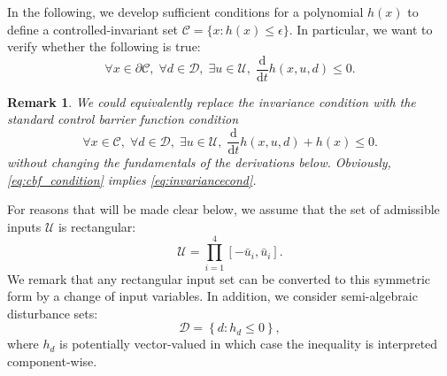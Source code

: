 \documentclass[conference]{IEEEtran}
\newtheorem{remark}{Remark}
\begin{document}
In the following, we develop sufficient conditions for a polynomial $h(x)$ to define a controlled-invariant set $\mathcal C = \{ x : h(x) \leq \epsilon \}$. In particular, we want to verify whether the following is true:
\begin{equation}
\label{eq:invariancecond}
   \forall x \in \partial \mathcal C, \;  \forall d \in \mathcal D, \; \exists u \in \mathcal U, \; \frac{\mathrm{d}}{\mathrm{d}t} h(x,u,d) \leq 0.
 \end{equation} 
\begin{remark}
  We could equivalently replace the invariance condition with the standard control barrier function condition
  \begin{equation}
  \label{eq:cbf_condition}
    \forall x \in \mathcal C, \;  \forall d \in \mathcal D, \; \exists u \in \mathcal U, \; \frac{\mathrm{d}}{\mathrm{d}t} h(x,u,d) + h(x) \leq 0.
  \end{equation}
  without changing the fundamentals of the derivations below. Obviously, \eqref{eq:cbf_condition} implies \eqref{eq:invariancecond}.
\end{remark}
 For reasons that will be made clear below, we assume that the set of admissible inputs $\mathcal U$ is rectangular:
 \begin{equation}
   \mathcal U = \prod_{i=1}^4 [-\bar u_i, \bar u_i].
 \end{equation}
 We remark that any rectangular input set can be converted to this symmetric form by a change of input variables. In addition, we consider semi-algebraic disturbance sets:
\begin{equation}
  \mathcal D = \left\{ d : h_d \leq 0 \right\},
\end{equation}
where $h_d$ is potentially vector-valued in which case the inequality is interpreted component-wise.
\end{document}
